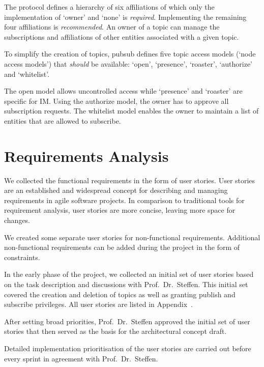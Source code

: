 The protocol defines a hierarchy of six affiliations of which only the implementation of `owner' and `none' is \emph{required}.
Implementing the remaining four affiliations is \emph{recommended}.
An owner of a \gls{topic} can manage the subscriptions and affiliations of other entities associated with a given \gls{topic}.

To simplify the creation of \glspl{topic}, \gls{pubsub} defines five \gls{topic} access models (`node access models') that \emph{should} be available: `open', `presence', `roaster', `authorize' and `whitelist'.

The open model allows uncontrolled access while `presence' and `roaster' are specific for IM. Using the authorize model, the owner has to approve all subscription requests. The whitelist model enables the owner to maintain a list of entities that are allowed to subscribe.

\section{Requirements Analysis}

We collected the functional requirements in the form of user stories.
User stories are an established and widespread concept for describing and managing requirements in agile software projects.
In comparison to traditional tools for requirement analysis, user stories are more concise, leaving more space for changes. \cite{wirdemann2017scrum}

We created some separate user stories for non-functional requirements.
Additional non-functional requirements can be added during the project in the form of constraints. \cite{wirdemann2017scrum}

In the early phase of the project, we collected an initial set of user stories based on the task description and discussions with Prof.\ Dr.\ Steffen.
This initial set covered the creation and deletion of \glspl{topic} as well as  granting publish and subscribe privileges.
All user stories are listed in Appendix~.

After setting broad priorities, Prof.\ Dr.\ Steffen approved the initial set of user stories that then served as the basis for the architectural concept draft.

Detailed implementation prioritisation of the user stories are carried out before every sprint in agreement with Prof.\ Dr.\ Steffen.

